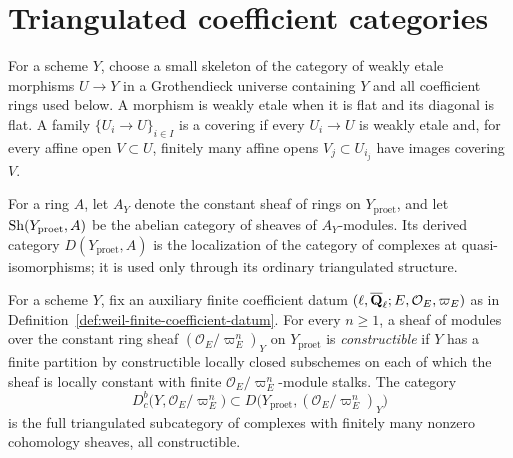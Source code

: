 
\section{Triangulated coefficient categories}

\begin{definition}
\label{def:weil-small-proetale-site}


For a scheme \(Y\), choose a small skeleton of the category of weakly etale
morphisms \(U\to Y\) in a Grothendieck universe containing \(Y\) and all
coefficient rings used below.  A morphism is
weakly etale when it is flat and its diagonal is flat.  A family
\(\{U_i\to U\}_{i\in I}\) is a covering if every \(U_i\to U\) is weakly
etale and, for every affine open \(V\subset U\), finitely many affine opens
\(V_j\subset U_{i_j}\) have images covering \(V\).

For a ring \(A\), let \(A_Y\) denote the constant sheaf of rings on
\(Y_{\mathrm{proet}}\), and let \(\operatorname{Sh}(Y_{\mathrm{proet}},A)\) be the abelian
category of sheaves of \(A_Y\)-modules.  Its derived category
\(D(Y_{\mathrm{proet}},A)\) is the localization of the category of complexes
at quasi-isomorphisms; it is used only through its ordinary triangulated
structure.
\end{definition}


\begin{definition}
\label{def:weil-finite-torsion-constructible}


For a scheme \(Y\), fix an auxiliary finite coefficient datum
\((\ell,\overline{\mathbf Q}_\ell;E,\mathcal O_E,\varpi_E)\) as in
Definition~\ref{def:weil-finite-coefficient-datum}.
For every \(n\geq1\), a sheaf of modules over the constant ring sheaf
\((\mathcal O_E/\varpi_E^n)_Y\) on \(Y_{\mathrm{proet}}\) is
\emph{constructible} if \(Y\) has a finite partition by constructible locally
closed subschemes on each of which the sheaf is locally constant with finite
\(\mathcal O_E/\varpi_E^n\)-module stalks.  The category
\[
 D^b_c\bigl(Y,\mathcal O_E/\varpi_E^n\bigr)
 \subset
 D\bigl(Y_{\mathrm{proet}},(\mathcal O_E/\varpi_E^n)_Y\bigr)
\]
is the full triangulated subcategory of complexes with finitely many nonzero
cohomology sheaves, all constructible.
\end{definition}

